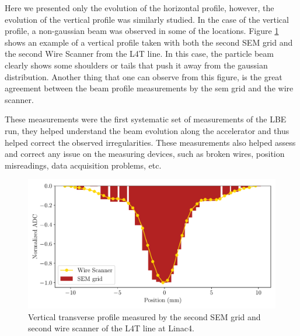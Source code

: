 Here we presented only the evolution of the horizontal profile, however, the evolution of the vertical profile was similarly studied. In the case of the vertical profile, a non-gaussian beam was observed in some of the locations. Figure \ref{fig:VertProf} shows an example of a vertical profile taken with both the second SEM grid and the second Wire Scanner from the L4T line. In this case, the particle beam clearly shows some shoulders or tails that push it away from the gaussian distribution. Another thing that one can observe from this figure, is the great agreement between the beam profile measurements by the sem grid and the wire scanner. 


These measurements were the first systematic set of measurements of the LBE run, they helped understand the beam evolution along the accelerator and thus helped correct the observed irregularities. These measurements also helped assess and correct any issue on the measuring devices, such as broken wires, position misreadings, data acquisition problems, etc.  

\begin{figure}[h]
    \centering
    \includegraphics[width=0.6\columnwidth]{VertProf/VertProf.pdf}
    \caption{Vertical transverse profile measured by the second SEM grid and second wire scanner of the L4T line at Linac4.}
    \label{fig:VertProf}
\end{figure}




